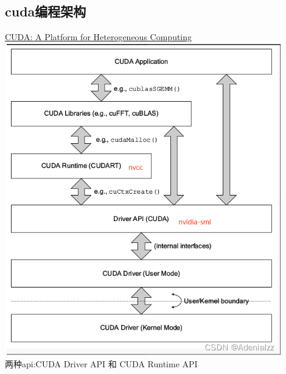 \subsection{cuda编程架构}
\noindent
\underline{CUDA: A Platform for Heterogeneous Computing}\\
\includegraphics[width=0.9\textwidth]{assets/cuda-platform.png}\\
两种api:CUDA Driver API 和 CUDA Runtime API\\
